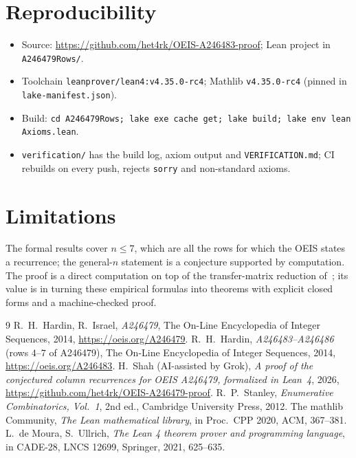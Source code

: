 \documentclass[11pt]{article}
\theoremstyle{remark}\newtheorem{remark}[theorem]{Remark}
\begin{document}
\section{Reproducibility}
\begin{itemize}
\item Source: \url{https://github.com/het4rk/OEIS-A246483-proof}; Lean project in \texttt{A246479Rows/}.
\item Toolchain \texttt{leanprover/lean4:v4.35.0-rc4}; Mathlib \texttt{v4.35.0-rc4} (pinned in \texttt{lake-manifest.json}).
\item Build: \texttt{cd A246479Rows; lake exe cache get; lake build; lake env lean Axioms.lean}.
\item \texttt{verification/} has the build log, axiom output and \texttt{VERIFICATION.md}; CI rebuilds on every push, rejects \texttt{sorry} and non-standard axioms.
\end{itemize}

\section{Limitations}
The formal results cover $n\le7$, which are all the rows for which the OEIS states a recurrence; the general-$n$ statement is a conjecture supported by computation. The proof is a direct computation on top of the transfer-matrix reduction of~\cite{a246479}; its value is in turning these empirical formulas into theorems with explicit closed forms and a machine-checked proof.

\begin{thebibliography}{9}
 R.~H.~Hardin, R.~Israel, \emph{A246479}, The On-Line Encyclopedia of Integer Sequences, 2014, \url{https://oeis.org/A246479}.
 R.~H.~Hardin, \emph{A246483--A246486} (rows $4$--$7$ of A246479), The On-Line Encyclopedia of Integer Sequences, 2014, \url{https://oeis.org/A246483}.
 H.~Shah (AI-assisted by Grok), \emph{A proof of the conjectured column recurrences for OEIS A246479, formalized in Lean~4}, 2026, \url{https://github.com/het4rk/OEIS-A246479-proof}.
 R.~P.~Stanley, \emph{Enumerative Combinatorics, Vol.~1}, 2nd ed., Cambridge University Press, 2012.
 The mathlib Community, \emph{The Lean mathematical library}, in Proc.\ CPP 2020, ACM, 367--381.
 L.~de Moura, S.~Ullrich, \emph{The Lean 4 theorem prover and programming language}, in CADE-28, LNCS 12699, Springer, 2021, 625--635.
\end{thebibliography}
\end{document}

